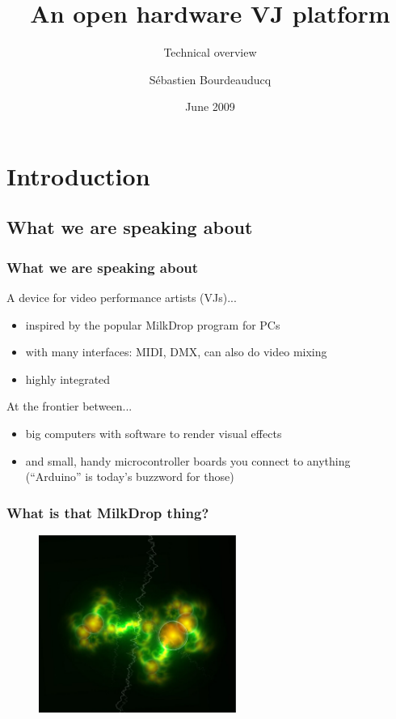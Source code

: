 \documentclass{beamer}
\title{An open hardware VJ platform}
\subtitle{Technical overview}
\author{S\'ebastien Bourdeauducq}
\date{June 2009}
\begin{document}

\section{Introduction}
\subsection{What we are speaking about}
\frame
{
  \frametitle{What we are speaking about}
A device for video performance artists (VJs)...
  \begin{itemize}
  \item inspired by the popular MilkDrop program for PCs
  \item with many interfaces: MIDI, DMX, can also do video mixing
  \item highly integrated
  \end{itemize}

At the frontier between...
  \begin{itemize}
  \item big computers with software to render visual effects
  \item and small, handy microcontroller boards you connect to anything\\(``Arduino'' is today's buzzword for those)
  \end{itemize}
}

\frame
{
  \frametitle{What is that MilkDrop thing?}
  \begin{figure}[H]
  \includegraphics[height=58mm]{milkdrop1.eps}
  \end{figure}
}
\end{document}
